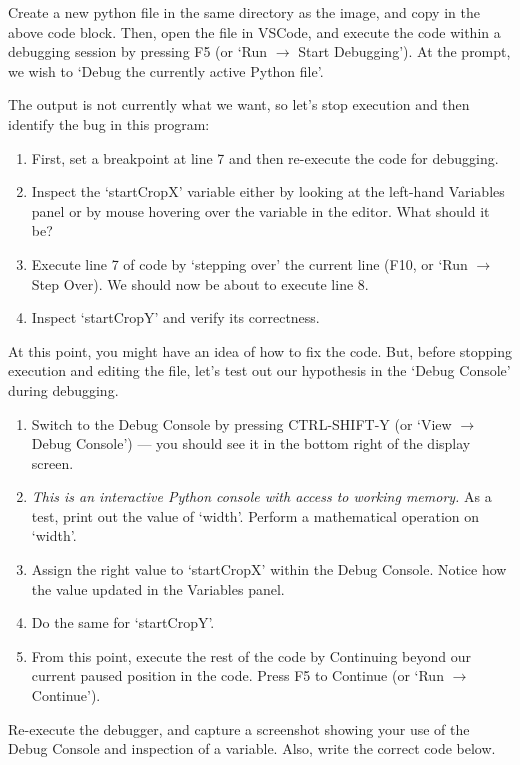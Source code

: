 \documentclass{csci1430}
\begin{document}
\begin{orangebox}
Create a new python file in the same directory as the image, and copy in the above code block. Then, open the file in VSCode, and execute the code within a debugging session by pressing F5 (or `Run $\rightarrow$ Start Debugging'). At the prompt, we wish to `Debug the currently active Python file'.

The output is not currently what we want, so let's stop execution and then identify the bug in this program:
\begin{enumerate}[leftmargin=12pt,itemsep=2pt]
    \item First, set a breakpoint at line 7 and then re-execute the code for debugging.
    \item Inspect the `startCropX' variable either by looking at the left-hand Variables panel or by mouse hovering over the variable in the editor. What should it be?
    \item Execute line 7 of code by `stepping over' the current line (F10, or `Run $\rightarrow$ Step Over). We should now be about to execute line 8.
    \item Inspect `startCropY' and verify its correctness.
\end{enumerate}

At this point, you might have an idea of how to fix the code. But, before stopping execution and editing the file, let's test out our hypothesis in the `Debug Console' during debugging.
\end{orangebox}

\pagebreak
\begin{orangebox}
\begin{enumerate}[leftmargin=12pt,itemsep=2pt]
    \item Switch to the Debug Console by pressing CTRL-SHIFT-Y (or `View $\rightarrow$ Debug Console') --- you should see it in the bottom right of the display screen.
    \item \emph{This is an interactive Python console with access to working memory.} As a test, print out the value of `width'. Perform a mathematical operation on `width'.
    \item Assign the right value to `startCropX' within the Debug Console. Notice how the value updated in the Variables panel.
    \item Do the same for `startCropY'.
    \item From this point, execute the rest of the code by Continuing beyond our current paused position in the code. Press F5 to Continue (or `Run $\rightarrow$ Continue').
\end{enumerate}

Re-execute the debugger, and capture a screenshot showing your use of the Debug Console and inspection of a variable. Also, write the correct code below.
\end{orangebox}
\end{document}

